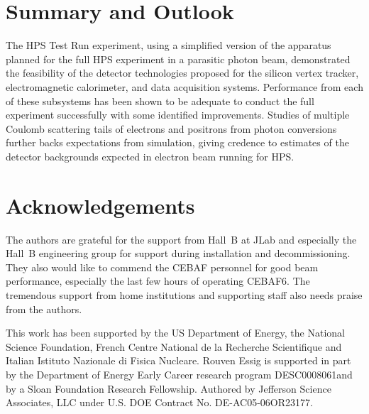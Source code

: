 \documentclass[final,3p,times,twocolumn]{elsarticle}
\begin{document}


\section{Summary and Outlook}
The HPS Test Run experiment, using a simplified version of the apparatus planned for the full HPS 
experiment in a parasitic photon beam, demonstrated the feasibility of the detector technologies 
proposed for the silicon vertex tracker, electromagnetic calorimeter, and data acquisition systems. 
Performance from each of these subsystems has been shown to be adequate to conduct the full 
experiment successfully with some identified improvements. Studies of multiple Coulomb scattering tails of electrons and positrons from 
photon conversions further backs expectations from simulation, giving credence to estimates of the 
detector backgrounds expected in electron beam running for HPS.  


\section{Acknowledgements}
The authors are grateful for the support from Hall~B at JLab and especially the Hall~B engineering 
group for support during installation and decommissioning. They also would like to commend the 
CEBAF personnel for good beam performance, especially the last few hours of operating CEBAF6. 
The tremendous support from home institutions and supporting staff also needs praise from the 
authors. 

This work has been supported by the US Department of Energy, 
the National Science Foundation,  
French Centre National de la Recherche Scientifique and 
Italian Istituto Nazionale di Fisica Nucleare. 
Rouven Essig is supported in part by the Department of Energy Early Career research program DESC0008061and by a Sloan Foundation Research Fellowship.
Authored by Jefferson Science Associates, LLC under U.S. DOE Contract No. DE-AC05-06OR23177.




\end{document}
